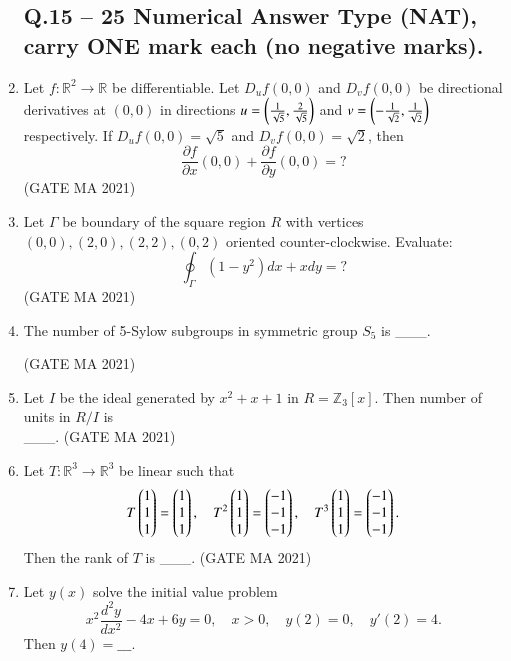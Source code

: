 \documentclass[journal,12pt,onecolumn]{IEEEtran}
\theoremstyle{remark}
\begin{document}
\begin{enumerate}
\subsection*{Q.15 -- 25 Numerical Answer Type (NAT), carry ONE mark each (no negative marks).}

    \item Let $f:\mathbb{R}^2 \to \mathbb{R}$ be differentiable. Let $D_u f(0,0)$ and $D_v f(0,0)$ be directional derivatives at $(0,0)$ in directions $u = \left(\frac{1}{\sqrt{5}}, \frac{2}{\sqrt{5}} \right)$ and $v = \left(-\frac{1}{\sqrt{2}}, \frac{1}{\sqrt{2}} \right)$ respectively. If $D_u f(0,0) = \sqrt{5}$ and $D_v f(0,0) = \sqrt{2}$, then
    $$
    \frac{\partial f}{\partial x}(0,0) + \frac{\partial f}{\partial y}(0,0) = \text{?}
    $$
\hfill(GATE MA 2021)
    \item Let $\Gamma$ be boundary of the square region $R$ with vertices $(0,0),(2,0),(2,2),(0,2)$ oriented counter-clockwise. Evaluate:
    $$
    \oint_{\Gamma} (1 - y^2) dx + x dy = \text{?}
    $$
\hfill(GATE MA 2021)
    \item The number of 5-Sylow subgroups in symmetric group $S_5$ is \_\_\_.

\hfill(GATE MA 2021)
    \item Let $I$ be the ideal generated by $x^2 + x + 1$ in $R = \mathbb{Z}_3[x]$. Then number of units in $R/I$ is \\ \_\_\_.
\hfill(GATE MA 2021)
    \item Let $T:\mathbb{R}^3 \to \mathbb{R}^3$ be linear such that
    $$
    T \begin{pmatrix}1 \\ 1 \\ 1 \end{pmatrix} = \begin{pmatrix}1 \\ 1 \\ 1\end{pmatrix}, \quad T^2\begin{pmatrix}1 \\ 1 \\ 1\end{pmatrix} = \begin{pmatrix}-1 \\ -1 \\ -1\end{pmatrix}, \quad T^3 \begin{pmatrix}1 \\ 1 \\ 1\end{pmatrix}=\begin{pmatrix}-1 \\ -1 \\ -1\end{pmatrix}.
    $$
    Then the rank of $T$ is \_\_\_.
\hfill(GATE MA 2021)
    \item Let $y(x)$ solve the initial value problem
    $$
    x^2 \frac{d^2 y}{dx^2} - 4x + 6y = 0, \quad x > 0,\quad y(2) = 0, \quad y'(2) = 4.
    $$
    Then $y(4) =\_\_\_$.


\end{enumerate}
\end{document}
